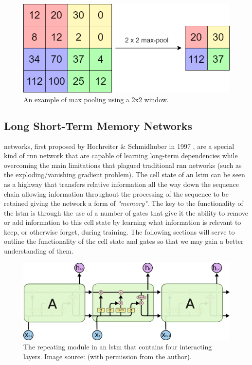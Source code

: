 \begin{figure}[hbt!]
    \centering
    \includegraphics[width=\textwidth]{Images/Chapter 3/CNN/Max-Pooling-Illustration.png}
    \caption{An example of max pooling using a 2x2 window.}
    \label{fig:Max-Pooling-Illustration}
\end{figure}

\clearpage

\subsection{Long Short-Term Memory Networks}
\label{subsec:Background-Information:Forecasting-Models:Long-Short-Term-Memory-Networks}
 networks, first proposed by Hochreiter \& Schmidhuber in 1997 \cite{Hochreiter}, are a special kind of \gls{rnn} network that are capable of learning long-term dependencies while overcoming the main limitations that plagued traditional \gls{rnn} networks (such as the exploding/vanishing gradient problem). The cell state of an \gls{lstm} can be seen as a highway that transfers relative information all the way down the sequence chain allowing information throughout the processing of the sequence to be retained giving the network a form of \textit{"memory"}. The key to the functionality of the \gls{lstm} is through the use of a number of gates that give it the ability to remove or add information to this cell state by learning what information is relevant to keep, or otherwise forget, during training. The following sections will serve to outline the functionality of the cell state and gates so that we may gain a better understanding of them.

\begin{figure}[hbt!]
    \centering
    \includegraphics[width=\textwidth]{Images/Chapter 3/LSTM/LSTM-Chain-Illustration.png}
    \caption{The repeating module in an \gls{lstm} that contains four interacting layers. Image source: \cite{Colah}  (with permission from the author).}
    \label{fig:LSTM-Chain-Illustration}
\end{figure}

